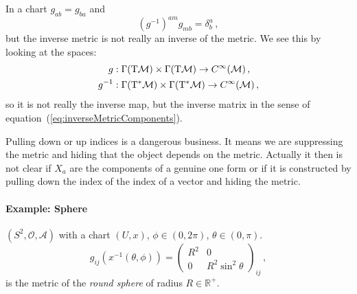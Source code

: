 \documentclass[11pt, a4paper, twocolumn]{article} %
\begin{document}
\begin{note}
    In a chart $g_{ab} = g_{ba}$ and
    \begin{equation}
        \left( g^{-1} \right)^{am} g_{mb} = \delta^a_b\,,
        \label{eq:inverseMetricComponents}
    \end{equation}
    but the inverse metric is not really an inverse of the metric.
    We see this by looking at the spaces:
    \begin{align}
        g&: \Gamma(\T\M)\times \Gamma(\T\M) \to C^\infty(\M)\,,\\
        g^{-1}&: \Gamma(\T^*\M)\times \Gamma(\T^*\M) \to C^\infty(\M)\,,
    \end{align}
    so it is not really the inverse map, but the inverse matrix in the sense
    of equation~(\ref{eq:inverseMetricComponents}).
\end{note}
\begin{note}
    Pulling down or up indices is a dangerous business.
    It means we are suppressing the metric and hiding
    that the object depends on the metric.
    Actually it then is not clear if $X_a$ are the
    components of a genuine one form or if it is
    constructed by pulling down the index of the index
    of a vector and hiding the metric.
\end{note}

\paragraph{Example: Sphere} $(S^2, \mathcal{O}, \mathcal{A})$
with a chart $(U,x)$, $\phi\in(0,2\pi)$, $\theta\in (0,\pi)$.
\begin{equation}
    g_{ij}\left(x^{-1}(\theta, \phi)\right) = 
    \begin{pmatrix}
        R^2 & 0 \\
        0 & R^2 \sin^2 \theta
    \end{pmatrix}_{ij}\,,
\end{equation}
is the metric of the \textit{round sphere} of radius $R\in\mathbb{R}^+$.
\end{document}
